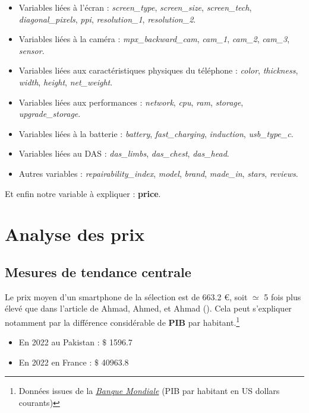 \documentclass[
  12pt,
]{report}
\providecommand{\tightlist}{%
  \setlength{\itemsep}{0pt}\setlength{\parskip}{0pt}}\usepackage{longtable,booktabs,array}
\begin{document}
\begin{itemize}
\item
  Variables liées à l'écran : \emph{screen\_type}, \emph{screen\_size},
  \emph{screen\_tech}, \emph{diagonal\_pixels}, \emph{ppi},
  \emph{resolution\_1}, \emph{resolution\_2}.
\item
  Variables liées à la caméra : \emph{mpx\_backward\_cam},
  \emph{cam\_1}, \emph{cam\_2}, \emph{cam\_3}, \emph{sensor}.
\item
  Variables liées aux caractéristiques physiques du téléphone :
  \emph{color}, \emph{thickness}, \emph{width}, \emph{height},
  \emph{net\_weight}.
\item
  Variables liées aux performances : \emph{network}, \emph{cpu},
  \emph{ram}, \emph{storage}, \emph{upgrade\_storage}.
\item
  Variables liées à la batterie : \emph{battery}, \emph{fast\_charging},
  \emph{induction}, \emph{usb\_type\_c}.
\item
  Variables liées au DAS : \emph{das\_limbs}, \emph{das\_chest},
  \emph{das\_head}.
\item
  Autres variables : \emph{repairability\_index}, \emph{model},
  \emph{brand}, \emph{made\_in}, \emph{stars}, \emph{reviews}.
\end{itemize}

Et enfin notre variable à expliquer : \textbf{price}.

\section{Analyse des prix}\label{analyse-des-prix}

\subsection{Mesures de tendance
centrale}\label{mesures-de-tendance-centrale}

Le prix moyen d'un smartphone de la sélection est de 663.2 €, soit
\(\simeq\) 5 fois plus élevé que dans l'article de Ahmad, Ahmed, et
Ahmad (). Cela peut s'expliquer notamment
par la différence considérable de \textbf{PIB} par habitant.\footnote{Données
  issues de la
  \href{https://donnees.banquemondiale.org/indicator/NY.GDP.PCAP.CD?most_recent_year_desc=true}{\emph{Banque
  Mondiale}} (PIB par habitant en US dollars courants)}

\begin{itemize}
\tightlist
\item
  En 2022 au Pakistan : \(\$\) 1596.7
\item
  En 2022 en France : \(\$\) 40963.8
\end{itemize}
\end{document}
